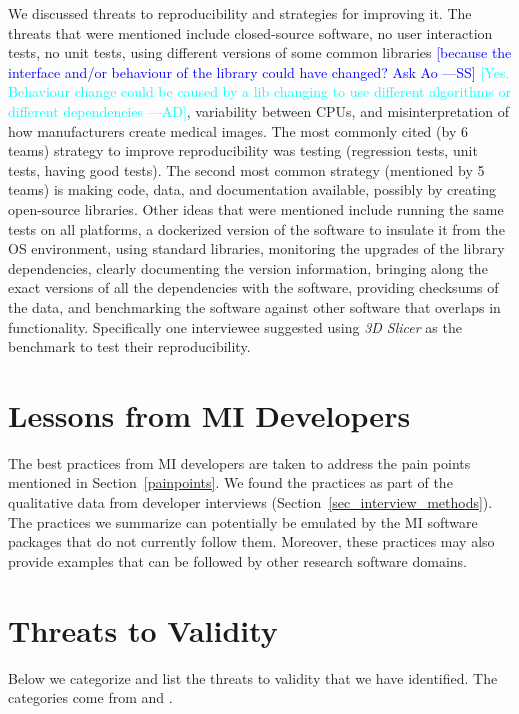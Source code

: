 \documentclass[final, 3p, times, authoryear]{elsarticle}
\newcommand{\authornote}[3]{\textcolor{#1}{[#3 ---#2]}}
\newcommand{\authornote}[3]{}
\newcommand{\wss}[1]{\authornote{blue}{SS}{#1}} %
\newcommand{\ad}[1]{\authornote{cyan}{AD}{#1}} %
\begin{document}
We discussed threats to reproducibility and strategies for improving it.  The
threats that were mentioned include closed-source software, no user interaction
tests, no unit tests, using different versions of some common libraries
\wss{because the interface and/or behaviour of the library could have changed?
Ask Ao} \ad{Yes. Behaviour change could be caused by a lib changing to use
different algorithms or different dependencies}, variability
between CPUs, and misinterpretation of how manufacturers
create medical images. The most commonly cited (by 6 teams) strategy to improve
reproducibility was testing (regression tests, unit tests, having good tests).
The second most common strategy (mentioned by 5 teams) is making code, data, and
documentation available, possibly by creating open-source libraries.  Other
ideas that were mentioned include running the same tests on all platforms, a
dockerized version of the software to insulate it from the OS environment, using
standard libraries, monitoring the upgrades of the library dependencies, clearly
documenting the version information, bringing along the exact versions of all
the dependencies with the software, providing checksums of the data, and
benchmarking the software against other software that overlaps in functionality.
Specifically one interviewee suggested using \textit{3D Slicer} as the benchmark
to test their reproducibility.

\section{Lessons from MI Developers} \label{Sec_AddressConcerns}

The best practices from MI developers are taken to address the pain points
mentioned in Section~\ref{painpoints}.  We found the practices as part of the
qualitative data from developer interviews
(Section~\ref{sec_interview_methods}).  The practices we summarize can
potentially be emulated by the MI software packages that do not currently follow
them.  Moreover, these practices may also provide examples that can be followed
by other research software domains.

\section{Threats to Validity} \label{sec_threats_to_validity}

Below we categorize and list the threats to validity that we have identified.
The categories come from \citet{AmpatzoglouEtAl2019} and \citet{ZhouEtAl2016}.
\end{document}
